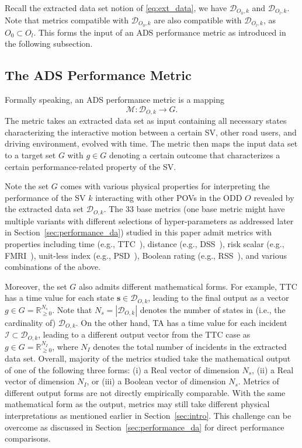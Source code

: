 \documentclass[journal]{IEEEtran}
\newcommand{\R}{\mathbb{R}}
\newcommand{\s}{\mathbf{s}}
\begin{document}
Recall the extracted data set notion of \eqref{eq:ext_data}, we have $\mathcal{D}_{O_0,k}$ and $\mathcal{D}_{O_l, k}$. Note that metrics compatible with $\mathcal{D}_{O_0,k}$ are also compatible with $\mathcal{D}_{O_l, k}$, as $O_0 \subset O_l$. This forms the input of an ADS performance metric as introduced in the following subsection.

\subsection{The ADS Performance Metric}\label{sec:preliminaries:metrics}
Formally speaking, an ADS performance metric is a mapping
\begin{equation}\label{eq:metric}
    \mathcal{M}: \mathcal{D}_{O, k} \rightarrow G.
\end{equation}
The metric takes an extracted data set as input containing all necessary states characterizing the interactive motion between a certain SV, other road users, and driving environment, evolved with time. The metric then maps the input data set to a target set $G$ with $g \in G$ denoting a certain outcome that characterizes a certain performance-related property of the SV. 

Note the set $G$ comes with various physical properties for interpreting the performance of the SV $k$ interacting with other POVs in the ODD $O$ revealed by the extracted data set $\mathcal{D}_{O, k}$. The 33 base metrics (one base metric might have multiple variants with different selections of hyper-parameters as addressed later in Section~\ref{sec:performance_da}) studied in this paper admit metrics with properties including time (e.g., TTC~\cite{hayward1972near}), distance (e.g., DSS~\cite{okamura2011impact}), risk scalar (e.g., FMRI~\cite{kalra2016driving}), unit-less index (e.g., PSD~\cite{astarita2019traffic}), Boolean rating (e.g., RSS~\cite{shalev2017formal}), and various combinations of the above.

Moreover, the set $G$ also admits different mathematical forms. For example, TTC has a time value for each state $\s \in \mathcal{D}_{O,k}$, leading to the final output as a vector $g \in G = \R_{\geq0}^{N_s}$. Note that $N_s = |\mathcal{D}_{O,k}|$ denotes the number of states in (i.e., the cardinality of) $\mathcal{D}_{O,k}$. On the other hand, TA has a time value for each incident $\mathcal{I} \subset \mathcal{D}_{O,k}$, leading to a different output vector from the TTC case as $g\in G=\R_{\geq0}^{N_I}$, where $N_I$ denotes the total number of incidents in the extracted data set. Overall, majority of the metrics studied take the mathematical output of one of the following three forms: (i) a Real vector of dimension $N_s$, (ii) a Real vector of dimension $N_I$, or (iii) a Boolean vector of dimension $N_s$. Metrics of different output forms are not directly empirically comparable. With the same mathematical form as the output, metrics may still take different physical interpretations as mentioned earlier in Section~\ref{sec:intro}. This challenge can be overcome as discussed in Section~\ref{sec:performance_da} for direct performance comparisons.
\end{document}

